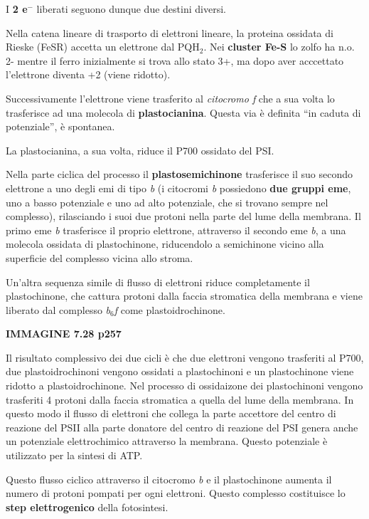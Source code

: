 \documentclass[]{article}
\begin{document}
I \textbf{2 e$^-$} liberati seguono dunque due destini diversi.

Nella catena lineare di trasporto di elettroni lineare, la proteina
ossidata di Rieske (FeSR) accetta un elettrone dal PQH$_2$. Nei
\textbf{cluster Fe-S} lo zolfo ha n.o. 2- mentre il ferro inizialmente
si trova allo stato 3+, ma dopo aver acccettato l'elettrone diventa +2
(viene ridotto).

Successivamente l'elettrone viene trasferito al \emph{citocromo f} che a
sua volta lo trasferisce ad una molecola di \textbf{plastocianina}.
Questa via è definita ``in caduta di potenziale'', è spontanea.

La plastocianina, a sua volta, riduce il P700 ossidato del PSI.

Nella parte ciclica del processo il \textbf{plastosemichinone}
trasferisce il suo secondo elettrone a uno degli emi di tipo \emph{b} (i
citocromi \emph{b} possiedono \textbf{due gruppi eme}, uno a basso
potenziale e uno ad alto potenziale, che si trovano sempre nel
complesso), rilasciando i suoi due protoni nella parte del lume della
membrana. Il primo eme \emph{b} trasferisce il proprio elettrone,
attraverso il secondo eme \emph{b}, a una molecola ossidata di
plastochinone, riducendolo a semichinone vicino alla superficie del
complesso vicina allo stroma.

Un'altra sequenza simile di flusso di elettroni riduce completamente il
plastochinone, che cattura protoni dalla faccia stromatica della
membrana e viene liberato dal complesso \emph{b$_6$f} come
plastoidrochinone.

\textbf{IMMAGINE 7.28 p257}

Il risultato complessivo dei due cicli è che due elettroni vengono
trasferiti al P700, due plastoidrochinoni vengono ossidati a
plastochinoni e un plastochinone viene ridotto a plastoidrochinone. Nel
processo di ossidaizone dei plastochinoni vengono trasferiti 4 protoni
dalla faccia stromatica a quella del lume della membrana. In questo modo
il flusso di elettroni che collega la parte accettore del centro di
reazione del PSII alla parte donatore del centro di reazione del PSI
genera anche un potenziale elettrochimico attraverso la membrana. Questo
potenziale è utilizzato per la sintesi di ATP.

Questo flusso ciclico attraverso il citocromo \emph{b} e il
plastochinone aumenta il numero di protoni pompati per ogni elettroni.
Questo complesso costituisce lo \textbf{step elettrogenico} della
fotosintesi.
\end{document}
